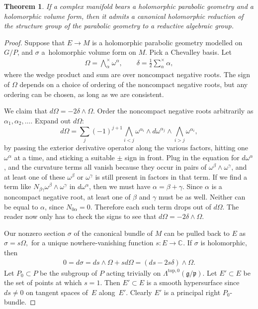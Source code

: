 \documentclass[11pt]{article}
\newtheorem{theorem}{Theorem}
\newcommand{\C}[1]{\ensuremath{\mathbb{C}^{#1}}}
\newcommand{\Gtot}{\ensuremath{G}}
\newcommand{\Gstruc}{P}
\begin{document}
\begin{theorem}\label{theorem:Reduction}
If a complex manifold bears a holomorphic parabolic geometry
and a holomorphic volume form, then it admits a canonical
holomorphic reduction of the structure group of the parabolic
geometry to a reductive algebraic group.
\end{theorem}
\begin{proof}
Suppose that $E \to M$ is a holomorphic parabolic
geometry modelled on $\Gtot/\Gstruc$,
and $\sigma$ a~holomorphic volume form on $M$.
Pick a Chevalley basis. Let
\begin{gather*}
\Omega  = \bigwedge^{\times}_{\alpha} \omega^{\alpha}, \qquad
\delta  = \frac{1}{2} \sum^{\times}_{\alpha} \alpha,
\end{gather*}
where the wedge product and sum are over noncompact negative roots.
The sign of $\Omega$ depends on a choice of ordering
of the noncompact negative roots, but any ordering can be chosen, as
long as we are consistent.

We claim that $d \Omega = - 2 \delta \wedge \Omega$.
Order the noncompact negative
roots arbitrarily as $\alpha_1, \alpha_2, \dots$.
Expand out $d \Omega$:
\[
d \Omega
=
 \sum_{j}
(-1)^{j+1}
\bigwedge_{i < j} \omega^{\alpha_i}
\wedge d \omega^{\alpha_j}
\wedge
\bigwedge_{i > j} \omega^{\alpha_i},
\]
by passing the exterior derivative operator along
the various factors, hitting one $\omega^{\alpha}$
at a time, and sticking a suitable $\pm$ sign in front.
Plug in the equation for $d \omega^{\alpha}$,
and the curvature terms all vanish because they
occur in pairs of $\omega^{\beta} \wedge \omega^{\gamma}$,
and at least one of these $\omega^{\beta}$ or $\omega^{\gamma}$
is still present in factors in that term.
If we f\/ind a term like $N_{\beta \gamma} \omega^{\beta}
\wedge \omega^{\gamma}$ in $d \omega^{\alpha}$,
then we must have $\alpha=\beta+\gamma$.
Since $\alpha$ is a noncompact negative root, at least one
of $\beta$ and $\gamma$ must be as well. Neither can be
equal to $\alpha$, since $N_{0\alpha}=0$. Therefore
each such term drops out of $d \Omega$. The reader
now only has to check the signs to see that
$d \Omega = -2 \delta \wedge \Omega$.

Our nonzero section $\sigma$ of the canonical
bundle of $M$ can be pulled back to $E$ as
\(
\sigma = s \Omega,
\)
for a unique nowhere-vanishing function $s : E \to \C{}$.
If $\sigma$ is holomorphic, then
\begin{gather*}
0  =
d\sigma
 =
ds \wedge \Omega + s   d \Omega
=
\left(ds - 2 s \delta \right) \wedge \Omega.
\end{gather*}
Let $P_0 \subset P$ be the subgroup of $P$
acting trivially on
$\Lambda^{\text{top},0}\left(\mathfrak{g}/\mathfrak{p}\right)$.
Let $E' \subset E$ be the set of points at which
$s=1$. Then $E' \subset E$ is a smooth hypersurface since $ds \ne 0$
on tangent spaces of~$E$ along~$E'.$ Clearly
$E'$ is a principal right $P_0$-bundle.


\end{proof}
\end{document}
